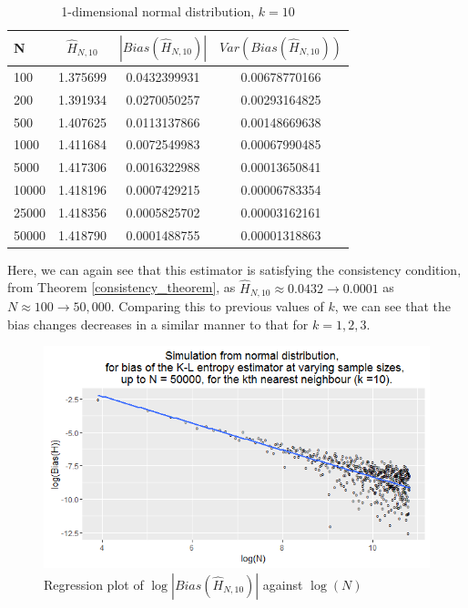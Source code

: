 \documentclass{article}
\begin{document}
\begin{table}
\caption{1-dimensional normal distribution, $k=10$} \label{normal_k=10_table}
\begin{center}
\begin{tabular}{| l | c c c|} 
\toprule
N & $\hat{H}_{N, 10}$ & $|Bias(\hat{H}_{N, 10})|$ & $Var(Bias(\hat{H}_{N, 10}))$ \\
\midrule[1pt]
100     & 1.375699     & 0.0432399931     & 0.00678770166  \\
200     & 1.391934     & 0.0270050257     & 0.00293164825  \\
500     & 1.407625     & 0.0113137866     & 0.00148669638  \\
1000    & 1.411684     & 0.0072549983     & 0.00067990485  \\
5000    & 1.417306     & 0.0016322988     & 0.00013650841  \\
10000   & 1.418196     & 0.0007429215     & 0.00006783354  \\
25000   & 1.418356     & 0.0005825702     & 0.00003162161  \\
50000   & 1.418790     & 0.0001488755     & 0.00001318863  \\
\hline
\end{tabular}
\end{center}
\end{table}

Here, we can again see that this estimator is satisfying the consistency condition, from Theorem \ref{consistency_theorem}, as $\hat{H}_{N, 10} \approx  0.0432 \to 0.0001$ as $N \approx 100 \to 50,000$. Comparing this to previous values of $k$, we can see that the bias changes decreases in a similar manner to that for $k=1, 2, 3$.

\begin{figure}
  \begin{center}
    \includegraphics[width=\textwidth]{./Graphs/Normal_k=10_plot.png}
  \end{center}
\caption{Regression plot of $\log|Bias(\hat{H}_{N, 10})|$ against $\log(N)$}
  \label{normal_k=10_graph}
\end{figure}
\end{document}
